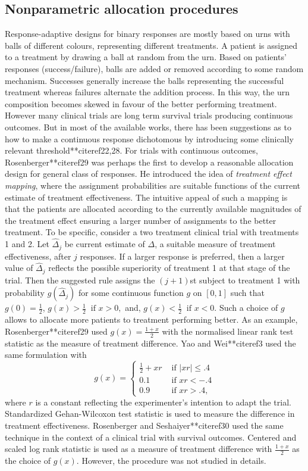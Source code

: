 \subsection{Nonparametric allocation procedures}

Response-adaptive designs for binary responses are mostly based on urns with balls of different colours, representing different treatments. A patient is assigned to a treatment by drawing a ball at random from the urn. Based on patients' responses (success/failure), balls are added or removed according to some random mechanism. Successes generally increase the balls
representing the successful treatment whereas failures alternate the
addition process. In this way, the urn composition becomes skewed in
favour of the better performing treatment. However many clinical
trials are long term survival trials producing continuous outcomes.
But in most of the available works, there has been suggestions as to
how to make a continuous response dichotomous by introducing some
clinically relevant threshold**citeref{22,28}. For trials with continuous outcomes, Rosenberger**citeref{29} was perhaps the first to develop a reasonable allocation design for general class of responses. He introduced the idea of \textit{treatment effect mapping}, where the assignment probabilities are suitable functions of the current estimate of treatment effectiveness. The
intuitive appeal of such a mapping is that the patients are
allocated according to the currently available magnitudes of the
treatment effect ensuring a larger number of assignments to the
better treatment. To be specific, consider a two treatment clinical
trial with treatments 1 and 2. Let ${\hat\Delta}_{j}$ be current estimate of $\Delta$, a suitable measure of treatment effectiveness, after $j$ responses. If a larger response is preferred, then a larger value of ${\hat\Delta}_{j}$ reflects the possible superiority
of treatment 1 at that stage of the trial. Then the suggested rule
assigns the $(j+1)$st subject to treatment 1 with probability
$g({\hat\Delta}_{j})$ for some continuous function $g$ on $[0,1]$ such that $g(0)=\frac{1}{2}$, $g(x)>\frac{1}{2} ~ \mbox{ if } x>0,$ and,
$g(x)< \frac{1}{2} ~ \mbox{ if } x<0.$ Such a choice
of $g$ allows to allocate more patients to treatment performing
better. As an example, Rosenberger**citeref{29} used $g(x)=\frac{1+x}{2}$
with the normalised linear rank test statistic as the measure of
treatment difference. Yao and Wei**citeref{3} used the same formulation
with
\[g(x) = \left\{
\begin{array}{ll}
\frac{1}{2}+ xr & \mbox{ if } |xr|\leq .4\\
0.1 & \mbox{ if } xr<-.4 \\
0.9 & \mbox{ if } xr>.4,
\end{array}
\right. \]
where $r$ is a constant reflecting the experimenter's intention to
adapt the trial. Standardized Gehan-Wilcoxon test statistic is used
to measure the difference in treatment effectiveness. Rosenberger
and Seshaiyer**citeref{30} used the same technique in the context of a
clinical trial with survival outcomes. Centered and scaled log rank
statistic is used as a measure of treatment difference with
$\frac{1+x}{2}$ as the choice of $g(x)$. However, the procedure
was not studied in details.

